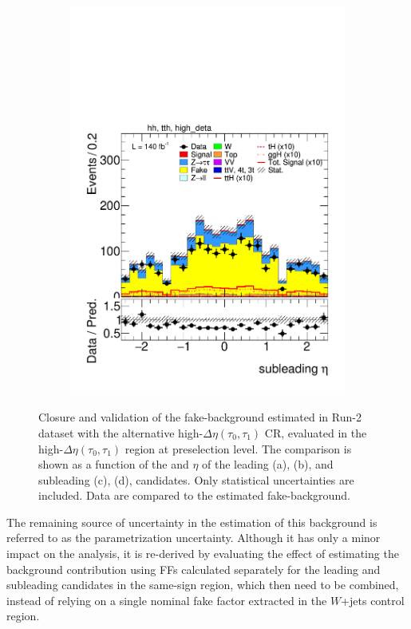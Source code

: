 \begin{figure}[htbp]
\begin{subfigure}[b]{0.45\textwidth}
          \includegraphics[width=\textwidth]{images/highdeta_highdeta_run2/plot_tau_1_eta_hh_tth_15_16_17_18_high_deta.pdf}
          \caption{}
        \end{subfigure}
        \caption{
    Closure and validation of the fake-\tauhad background estimated in Run-2 dataset with the alternative high-$\Delta \eta (\tau_0, \tau_1)$ \tauhadhad CR, evaluated in the high-$\Delta \eta (\tau_0, \tau_1)$ region at preselection level.
    The comparison is shown as a function of the \pt and $\eta$ of the leading (a), (b), and subleading (c), (d), \tauhad candidates. Only statistical uncertainties are included.
    Data are compared to the estimated fake-\tauhad background.
  }
  \label{fig:closure_validation_highdeta_run2}
\end{figure}

The remaining source of uncertainty in the estimation of this background is referred to as the parametrization uncertainty. Although it has only a minor impact on the analysis, it is re-derived by evaluating the effect of estimating the background contribution using FFs calculated separately for the leading and subleading \tauhad candidates in the \tauhadhad same-sign region, which then need to be combined, instead of relying on a single nominal fake factor extracted in the \taulephad $W$+jets control region.  

